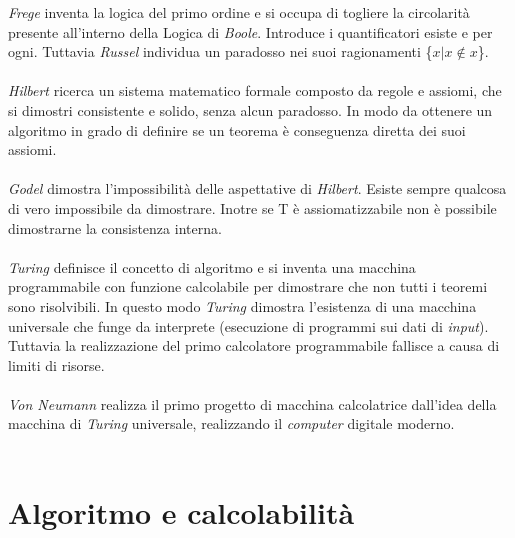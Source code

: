 \documentclass[10pt,a4paper]{book}
\begin{document}
\textit{Frege} inventa la logica del primo ordine e si occupa di togliere la circolarit\`a presente all'interno della Logica di \textit{Boole}. Introduce i quantificatori esiste e per ogni. Tuttavia \textit{Russel} individua un paradosso nei suoi ragionamenti \{$x | x \notin x$\}.\\\\
\noindent
\textit{Hilbert} ricerca un sistema matematico formale composto da regole e assiomi, che si dimostri consistente e solido, senza alcun paradosso. In modo da ottenere un algoritmo in grado di definire se un teorema \`e conseguenza diretta dei suoi assiomi.\\\\
\textit{Godel} dimostra l'impossibilit\`a delle aspettative di \textit{Hilbert}. Esiste sempre qualcosa di vero impossibile da dimostrare. Inotre se T \`e assiomatizzabile non \`e possibile dimostrarne la consistenza interna.\\\\
\textit{Turing} definisce il concetto di algoritmo e si inventa una macchina programmabile con funzione calcolabile per dimostrare che non tutti i teoremi sono risolvibili. In questo modo \textit{Turing} dimostra l'esistenza di una macchina universale che funge da interprete (esecuzione di programmi sui dati di \textit{input}). Tuttavia la realizzazione del primo calcolatore programmabile fallisce a causa di limiti di risorse.\\\\
\textit{Von Neumann} realizza il primo progetto di macchina calcolatrice dall'idea della macchina di \textit{Turing} universale, realizzando il \textit{computer} digitale moderno.\\\\
\pagebreak

\chapter{Algoritmo e calcolabilit\`a}
\end{document}
